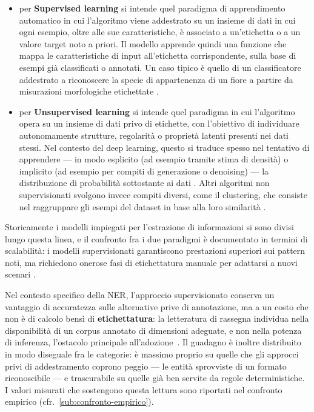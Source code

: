 \begin{itemize}
	\item per \textbf{Supervised learning} si intende quel paradigma di apprendimento automatico in cui l'algoritmo viene addestrato su un insieme di dati in cui ogni esempio, oltre alle sue caratteristiche, è associato a un'etichetta o a un valore target noto a priori. Il modello apprende quindi una funzione che mappa le caratteristiche di input all'etichetta corrispondente, sulla base di esempi già classificati o annotati. Un caso tipico è quello di un classificatore addestrato a riconoscere la specie di appartenenza di un fiore a partire da misurazioni morfologiche etichettate \cite[§~5.7]{DeeplearningbookorgContentsMlhtml}.

	\item per \textbf{Unsupervised learning} si intende quel paradigma in cui l'algoritmo opera su un insieme di dati privo di etichette, con l'obiettivo di individuare autonomamente strutture, regolarità o proprietà latenti presenti nei dati stessi. Nel contesto del deep learning, questo si traduce spesso nel tentativo di apprendere — in modo esplicito (ad esempio tramite stima di densità) o implicito (ad esempio per compiti di generazione o denoising) — la distribuzione di probabilità sottostante ai dati \cite[§~5.8]{DeeplearningbookorgContentsMlhtml}. Altri algoritmi non supervisionati svolgono invece compiti diversi, come il clustering, che consiste nel raggruppare gli esempi del dataset in base alla loro similarità \cite[§~9.1]{bishopPatternRecognitionMachine2006}.
\end{itemize}

Storicamente i modelli impiegati per l'estrazione di informazioni si sono divisi lungo questa linea, e il confronto fra i due paradigmi è documentato in termini di scalabilità: i modelli supervisionati garantiscono prestazioni superiori sui pattern noti, ma richiedono onerose fasi di etichettatura manuale per adattarsi a nuovi scenari \cite{jordanMachineLearningTrends2015}. \medskip

Nel contesto specifico della NER, l'approccio supervisionato conserva un vantaggio di accuratezza sulle alternative prive di annotazione, ma a un costo che non è di calcolo bensì di \textbf{etichettatura}: la letteratura di rassegna individua nella disponibilità di un corpus annotato di dimensioni adeguate, e non nella potenza di inferenza, l'ostacolo principale all'adozione~\cite{keraghelRecentAdvancesNamed2024, africanoPIIDetectionLowResource2024}. Il guadagno è inoltre distribuito in modo diseguale fra le categorie: è massimo proprio su quelle che gli approcci privi di addestramento coprono peggio --- le entità sprovviste di un formato riconoscibile --- e trascurabile su quelle già ben servite da regole deterministiche. I valori misurati che sostengono questa lettura sono riportati nel confronto empirico (cfr.~\ref{sub:confronto-empirico}).

